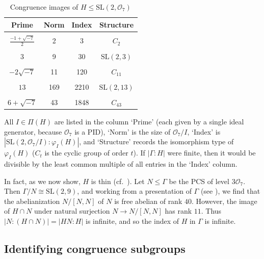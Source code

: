 \documentclass[11pt]{amsart}
\theoremstyle{definition}
\theoremstyle{remark}
\newcommand{\G}{{\Gamma}}
\newcommand{\SL}{\mathrm{SL}}
\begin{document}
\begin{table}[h!]
\begin{center}
\caption{Congruence images of 
$H\le\SL(2, \mathcal{O}_7)$}
\label{tab:table1}
\begin{tabular}{|c|c|c|c|}
\hline
Prime & Norm & Index  & Structure \\
\hline
\vspace{-12pt} & & &  \\
$\frac{-1+\sqrt{-7}}{2}$&2&3&$C_2$\\
\vspace{-12pt} & & &  \\
$3$&9&30&$\SL(2,3)$\\
\vspace{-12pt} & & &  \\
$-2\sqrt{-7}$&11&120&$C_{11}$\\
\vspace{-12pt} & & &  \\
$13$&169&2210&$\SL(2,13)$\\
\vspace{-12pt} & & &  \\
$6+\sqrt{-7}$&43&1848&$C_{43}$\\

\hline
\end{tabular}
\end{center}
\end{table}

 All $I\in \Pi(H)$ are listed in the column `Prime' 
(each given by a single ideal generator,
 because $\mathcal{O}_7$ is a PID), `Norm' is the size of 
$\mathcal{O}_7/I$, `Index' is 
$|\SL(2, \mathcal{O}_7/I):\varphi_I(H)|$, and `Structure' 
records the isomorphism type of $\varphi_I(H)$ ($C_t$ is
 the cyclic group of order $t$). If $|\G:H|$ were finite,  
then it would be divisible by the least common multiple of all 
entries in the `Index' column.
 
In fact, as we now show, $H$ is thin (cf.~\cite[pp.~84--85]{Hulpke}).
Let $N\leq \G$ be the PCS of level $3\mathcal{O}_7$. Then 
$\G/N \cong \SL(2,9)$, and working from a presentation of $\G$ 
(see \cite[Theorem~13.1]{Swan}), we find that the abelianization 
$N/[N,N]$ of $N$ is free abelian of rank $40$. However, the image of 
$H\cap N$ under natural surjection $N\rightarrow N/[N,N]$ has rank 
$11$. Thus $|N:(H\cap N)| = |HN:H|$ is infinite, and so the index of
$H$ in $\G$ is infinite.

\subsection{Identifying congruence subgroups}
\end{document}
